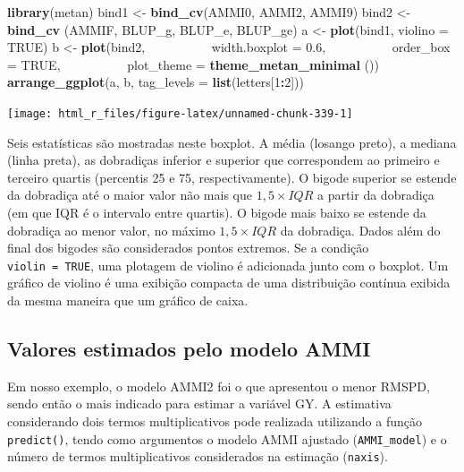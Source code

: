 \documentclass[
]{book}
\makeatletter
\newenvironment{Shaded}{\begin{snugshade}}{\end{snugshade}}
\newcommand{\DataTypeTok}[1]{\textcolor[rgb]{0.13,0.29,0.53}{#1}}
\newcommand{\DecValTok}[1]{\textcolor[rgb]{0.00,0.00,0.81}{#1}}
\newcommand{\FloatTok}[1]{\textcolor[rgb]{0.00,0.00,0.81}{#1}}
\newcommand{\KeywordTok}[1]{\textcolor[rgb]{0.13,0.29,0.53}{\textbf{#1}}}
\newcommand{\NormalTok}[1]{#1}
\newcommand{\OperatorTok}[1]{\textcolor[rgb]{0.81,0.36,0.00}{\textbf{#1}}}
\newcommand{\OtherTok}[1]{\textcolor[rgb]{0.56,0.35,0.01}{#1}}
\newcommand{\StringTok}[1]{\textcolor[rgb]{0.31,0.60,0.02}{#1}}
\numberwithin{equation}{section}
\newcommand{\indf}[1]{\index[function]{#1@\texttt{#1()}|ST}}
\makeatother
\begin{document}
\begin{Shaded}
\begin{Highlighting}[]
\KeywordTok{library}\NormalTok{(metan)}
\NormalTok{bind1 \textless{}{-}}\StringTok{ }\KeywordTok{bind\_cv}\NormalTok{(AMMI0, AMMI2, AMMI9)}
\NormalTok{bind2 \textless{}{-}}\StringTok{ }\KeywordTok{bind\_cv}\NormalTok{ (AMMIF, BLUP\_g, BLUP\_e, BLUP\_ge)}
\NormalTok{a \textless{}{-}}\StringTok{ }\KeywordTok{plot}\NormalTok{(bind1, }\DataTypeTok{violino =} \OtherTok{TRUE}\NormalTok{)}
\NormalTok{b \textless{}{-}}\StringTok{ }\KeywordTok{plot}\NormalTok{(bind2,}
          \DataTypeTok{width.boxplot =} \FloatTok{0.6}\NormalTok{,}
          \DataTypeTok{order\_box =} \OtherTok{TRUE}\NormalTok{,}
          \DataTypeTok{plot\_theme =} \KeywordTok{theme\_metan\_minimal}\NormalTok{ ())}
\KeywordTok{arrange\_ggplot}\NormalTok{(a, b, }\DataTypeTok{tag\_levels =} \KeywordTok{list}\NormalTok{(letters[}\DecValTok{1}\OperatorTok{:}\DecValTok{2}\NormalTok{]))}
\end{Highlighting}
\end{Shaded}

\texttt{[image: html\_r\_files/figure-latex/unnamed-chunk-339-1]}

Seis estatísticas são mostradas neste boxplot. A média (losango preto), a mediana (linha preta), as dobradiças inferior e superior que correspondem ao primeiro e terceiro quartis (percentis 25 e 75, respectivamente). O bigode superior se estende da dobradiça até o maior valor não mais que \(1,5 \times {IQR}\) a partir da dobradiça (em que IQR é o intervalo entre quartis). O bigode mais baixo se estende da dobradiça ao menor valor, no máximo \(1,5 \times {IQR}\) da dobradiça. Dados além do final dos bigodes são considerados pontos extremos. Se a condição \texttt{violin\ =\ TRUE}, uma plotagem de violino é adicionada junto com o boxplot. Um gráfico de violino é uma exibição compacta de uma distribuição contínua exibida da mesma maneira que um gráfico de caixa.

\hypertarget{valores-estimados-pelo-modelo-ammi}{%
\subsection{Valores estimados pelo modelo AMMI}\label{valores-estimados-pelo-modelo-ammi}}

Em nosso exemplo, o modelo AMMI2 foi o que apresentou o menor RMSPD, sendo então o mais indicado para estimar a variável GY. A estimativa considerando dois termos multiplicativos pode realizada utilizando a função \texttt{predict()}, tendo como argumentos o modelo AMMI ajustado (\texttt{AMMI\_model}) e o número de termos multiplicativos considerados na estimação (\texttt{naxis}). \indf{predict}
\end{document}
